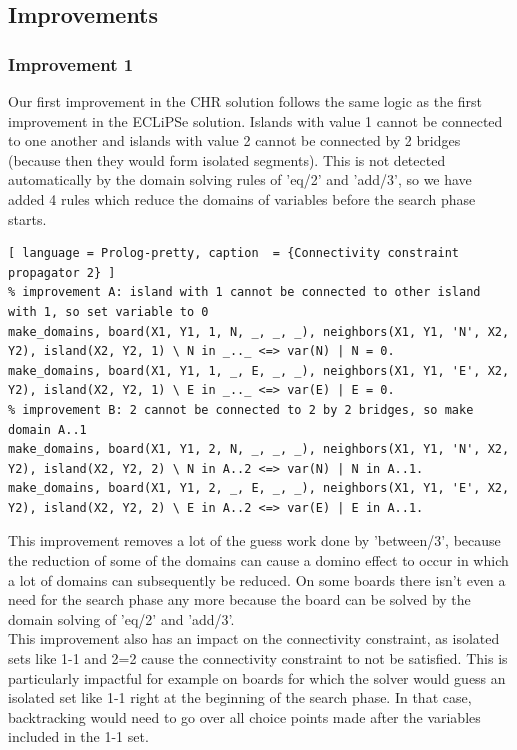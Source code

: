 \documentclass{report}
\begin{document}
\subsection{Improvements}
\subsubsection{Improvement 1}
Our first improvement in the CHR solution follows the same logic as the first improvement in the ECLiPSe solution. Islands with value 1 cannot be connected to one another and islands with value 2 cannot be connected by 2 bridges (because then they would form isolated segments). This is not detected automatically by the domain solving rules of 'eq/2' and 'add/3', so we have added 4 rules which reduce the domains of variables before the search phase starts.

\begin{lstlisting}[ language = Prolog-pretty, caption  = {Connectivity constraint propagator 2} ]
% improvement A: island with 1 cannot be connected to other island with 1, so set variable to 0
make_domains, board(X1, Y1, 1, N, _, _, _), neighbors(X1, Y1, 'N', X2, Y2), island(X2, Y2, 1) \ N in _.._ <=> var(N) | N = 0.
make_domains, board(X1, Y1, 1, _, E, _, _), neighbors(X1, Y1, 'E', X2, Y2), island(X2, Y2, 1) \ E in _.._ <=> var(E) | E = 0.
% improvement B: 2 cannot be connected to 2 by 2 bridges, so make domain A..1
make_domains, board(X1, Y1, 2, N, _, _, _), neighbors(X1, Y1, 'N', X2, Y2), island(X2, Y2, 2) \ N in A..2 <=> var(N) | N in A..1.
make_domains, board(X1, Y1, 2, _, E, _, _), neighbors(X1, Y1, 'E', X2, Y2), island(X2, Y2, 2) \ E in A..2 <=> var(E) | E in A..1.
\end{lstlisting}

This improvement removes a lot of the guess work done by 'between/3', because the reduction of some of the domains can cause a domino effect to occur in which a lot of domains can subsequently be reduced. On some boards there isn't even a need for the search phase any more because the board can be solved by the domain solving of 'eq/2' and 'add/3'. \\
This improvement also has an impact on the connectivity constraint, as isolated sets like 1-1 and 2=2 cause the connectivity constraint to not be satisfied. This is particularly impactful for example on boards for which the solver would guess an isolated set like 1-1 right at the beginning of the search phase. In that case, backtracking would need to go over all choice points made after the variables included in the 1-1 set.
\end{document}
